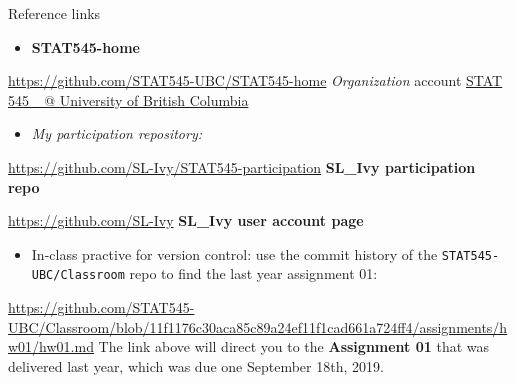 \documentclass[]{article}
\title{}
\author{}
\date{}
\providecommand{\tightlist}{%
  \setlength{\itemsep}{0pt}\setlength{\parskip}{0pt}}
\begin{document}
Reference links

\begin{itemize}
\tightlist
\item
  \textbf{STAT545-home}
\end{itemize}

\url{https://github.com/STAT545-UBC/STAT545-home} \emph{Organization}
account \href{https://github.com/STAT545-UBC}{STAT 545\_ @ University of
British Columbia}

\begin{itemize}
\tightlist
\item
  \emph{My participation repository:}
\end{itemize}

\url{https://github.com/SL-Ivy/STAT545-participation} \textbf{SL\_Ivy
participation repo}

\url{https://github.com/SL-Ivy} \textbf{SL\_Ivy user account page}

\begin{itemize}
\tightlist
\item
  In-class practive for version control: use the commit history of the
  \texttt{STAT545-UBC/Classroom} repo to find the last year assignment
  01:
\end{itemize}

\url{https://github.com/STAT545-UBC/Classroom/blob/11f1176c30aca85c89a24ef11f1cad661a724ff4/assignments/hw01/hw01.md}
The link above will direct you to the \textbf{Assignment 01} that was
delivered last year, which was due one September 18th, 2019.
\end{document}
